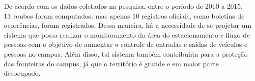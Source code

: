 De acordo com os dados coletados na pesquisa, entre o período de 2010 a 2015, 13 roubos foram computados, mas apenas 10 registros oficiais, como boletins de ocorrências, foram registrados. Dessa maneira, há a necessidade de se projetar  um sistema que possa realizar o monitoramento  da área do estacionamento e fluxo de pessoas  com o objetivo de aumentar o controle de entradas e saídas de veículos e pessoas no campus. Além disso, tal sistema também contribuiria para a proteção das fronteiras do campus, já que o território é grande e em maior parte desocupado.
